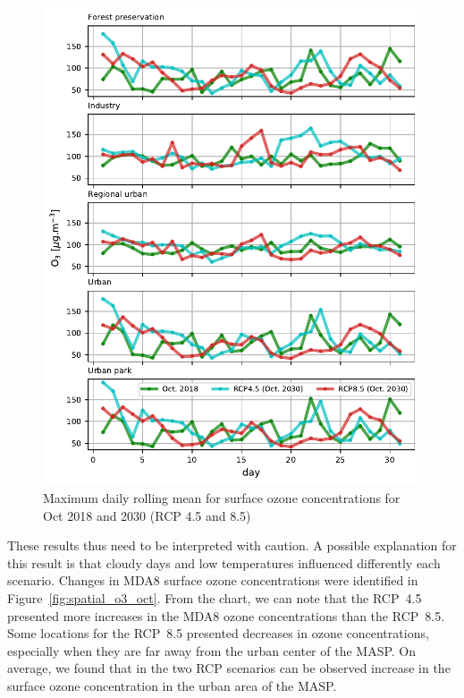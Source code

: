 \begin{figure}[!hbt]
  \begin{center}
	\includegraphics{fig/MDA8_type_rcps_oct18}
  \end{center}
  \caption{Maximum daily rolling mean for surface ozone concentrations for Oct 2018 and 2030 (RCP 4.5 and 8.5)}
  \label{fig:MDA8_rcp_oct}
\end{figure}

These results thus need to be interpreted with caution.
A possible explanation for this result is that cloudy days and low temperatures influenced differently each scenario.
Changes in MDA8 surface ozone concentrations were identified in Figure~\ref{fig:spatial_o3_oct}. 
From the chart, we can note that the RCP~4.5 presented more increases in the MDA8 ozone concentrations than the RCP~8.5.
Some locations for the RCP~8.5 presented decreases in ozone concentrations, especially when they are far away from the urban center of the MASP.
On average, we found that in the two RCP scenarios can be observed increase in the surface ozone concentration in the urban area of the MASP.


